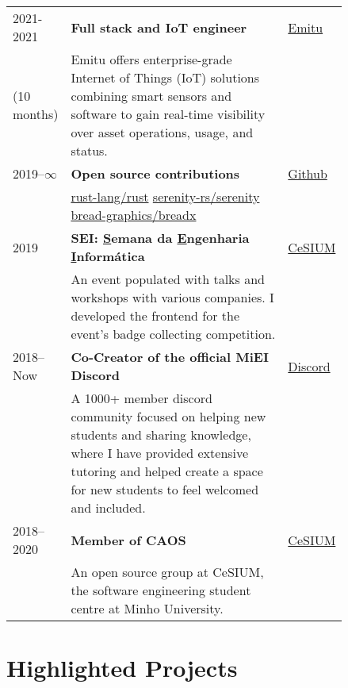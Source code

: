 \documentclass{article}
\newcommand{\ul}[1]{\underline{#1}}
\begin{document}
\begin{tabular}{p{0.11\linewidth}p{0.73\linewidth}l}
    2021-2021
    &
        \textbf{Full stack and IoT engineer}
    &
        \href{https://emitu.com}{Emitu}
    \\
    (10 months)
    &
    Emitu offers enterprise-grade Internet of Things (IoT) solutions combining
    smart sensors and software to gain real-time visibility over asset
    operations, usage, and status.
    & \\

    2019--$\infty$
    &
        \textbf{Open source contributions}
    &
        \href{https://github.com}{Github}
    \\
    &
    \href{https://github.com/rust-lang/rust/pulls?q=author\%3Amendess+}
        {rust-lang/rust}
    \hspace{2em}
    \href{https://github.com/serenity-rs/serenity/pulls?q=author\%3Amendess+}
        {serenity-rs/serenity}
    \hspace{2em}
    \href{https://github.com/bread-graphics/breadx/pulls?q=author\%3Amendess+}
        {bread-graphics/breadx}
    &\\

    2019
    &
        \textbf{SEI\@: \ul{S}emana da \ul{E}ngenharia \ul{I}nformática}
    &
        \href{https://cesium.di.uminho.pt/}{CeSIUM}
    \\
    &
    An event populated with talks and workshops with various companies. I
    developed the frontend for the event's badge collecting competition.
    &\\

    2018--Now
    &
        \textbf{Co-Creator of the official MiEI Discord}
    &
        \href{discord.com}{Discord}
    \\
    &
    A 1000+ member discord community focused on helping new students and
    sharing knowledge, where I have provided extensive tutoring and helped
    create a space for new students to feel welcomed and included.
    &\\

    2018--2020
    &
        \textbf{Member of CAOS}
    &
        \href{https://cesium.di.uminho.pt/}{CeSIUM}
    \\
    &
    An open source group at CeSIUM, the software engineering student centre at
    Minho University.
    &\\

\end{tabular}

\section{Highlighted Projects}
\end{document}
